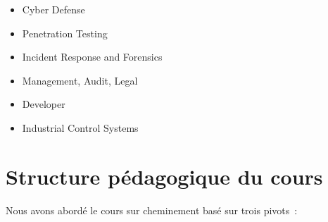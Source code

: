 \begin{itemize}
  \item Cyber Defense
  \item Penetration Testing
  \item Incident Response and Forensics
  \item Management, Audit, Legal
  \item Developer
  \item Industrial Control Systems

\end{itemize}




\section {Structure pédagogique du cours}
Nous avons abordé le cours sur cheminement basé sur trois pivots :

